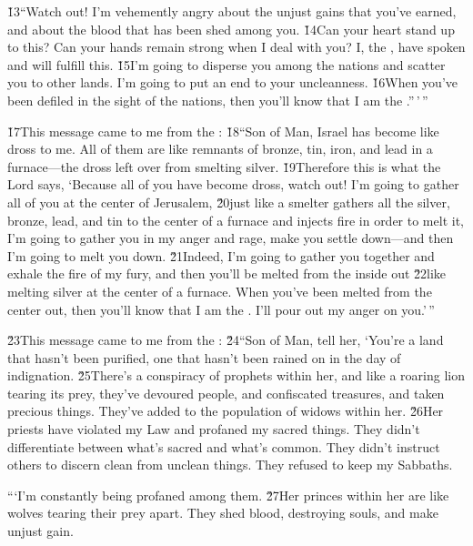 \v{13}``Watch out! I'm vehemently angry about the unjust gains that you've earned, and about the blood that has been shed among you. \v{14}Can your heart stand up to this? Can your hands remain strong when I deal with you? I, the , have spoken and will fulfill this. \v{15}I'm going to disperse you among the nations and scatter you to other lands. I'm going to put an end to your uncleanness. \v{16}When you've been defiled in the sight of the nations, then you'll know that I am the .''\,'\,''

\v{17}This message came to me from the : \v{18}``Son of Man, Israel has become like dross to me. All of them are like remnants of bronze, tin, iron, and lead in a furnace---the dross left over from smelting silver. \v{19}Therefore this is what the Lord  says, `Because all of you have become dross, watch out! I'm going to gather all of you at the center of Jerusalem, \v{20}just like a smelter gathers all the silver, bronze, lead, and tin to the center of a furnace and injects fire in order to melt it, I'm going to gather you in my anger and rage, make you settle down---and then I'm going to melt you down. \v{21}Indeed, I'm going to gather you together and exhale the fire of my fury, and then you'll be melted from the inside out \v{22}like melting silver at the center of a furnace. When you've been melted from the center out, then you'll know that I am the . I'll pour out my anger on you.'\,''

\v{23}This message came to me from the : \v{24}``Son of Man, tell her, `You're a land that hasn't been purified, one that hasn't been rained on in the day of indignation. \v{25}There's a conspiracy of prophets within her, and like a roaring lion tearing its prey, they've devoured people, and confiscated treasures, and taken precious things. They've added to the population of widows within her. \v{26}Her priests have violated my Law and profaned my sacred things. They didn't differentiate between what's sacred and what's common. They didn't instruct others to discern clean from unclean things. They refused to keep my Sabbaths.

```I'm constantly being profaned among them. \v{27}Her princes within her are like wolves tearing their prey apart. They shed blood, destroying souls, and make unjust gain.

